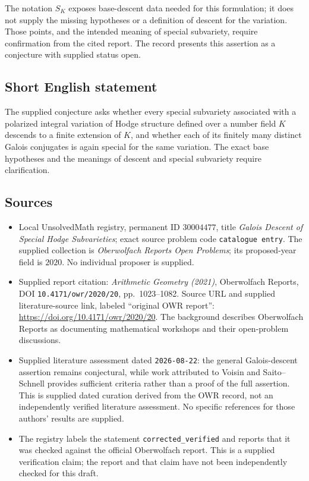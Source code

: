 \documentclass[11pt]{article}
\begin{document}
The notation \(S_K\) exposes base-descent data needed for this formulation; it does not supply the missing hypotheses or a definition of descent for the variation. Those points, and the intended meaning of special subvariety, require confirmation from the cited report. The record presents this assertion as a conjecture with supplied status open.
\subsection{Short English statement}
The supplied conjecture asks whether every special subvariety associated with a polarized integral variation of Hodge structure defined over a number field \(K\) descends to a finite extension of \(K\), and whether each of its finitely many distinct Galois conjugates is again special for the same variation. The exact base hypotheses and the meanings of descent and special subvariety require clarification.
\subsection{Sources}
\begin{itemize}
\item Local UnsolvedMath registry, permanent ID \(30004477\), title \emph{Galois Descent of Special Hodge Subvarieties}; exact source problem code \texttt{catalogue entry}. The supplied collection is \emph{Oberwolfach Reports Open Problems}; its proposed-year field is \(2020\). No individual proposer is supplied.
\item Supplied report citation: \emph{Arithmetic Geometry (2021)}, Oberwolfach Reports, DOI \texttt{10.4171/owr/2020/20}, pp.\ 1023--1082. Source URL and supplied literature-source link, labeled ``original OWR report'': \url{https://doi.org/10.4171/owr/2020/20}. The background describes Oberwolfach Reports as documenting mathematical workshops and their open-problem discussions.
\item Supplied literature assessment dated \texttt{2026-08-22}: the general Galois-descent assertion remains conjectural, while work attributed to Voisin and Saito--Schnell provides sufficient criteria rather than a proof of the full assertion. This is supplied dated curation derived from the OWR record, not an independently verified literature assessment. No specific references for those authors' results are supplied.
\item The registry labels the statement \texttt{corrected\_verified} and reports that it was checked against the official Oberwolfach report. This is a supplied verification claim; the report and that claim have not been independently checked for this draft.
\end{itemize}
\end{document}
